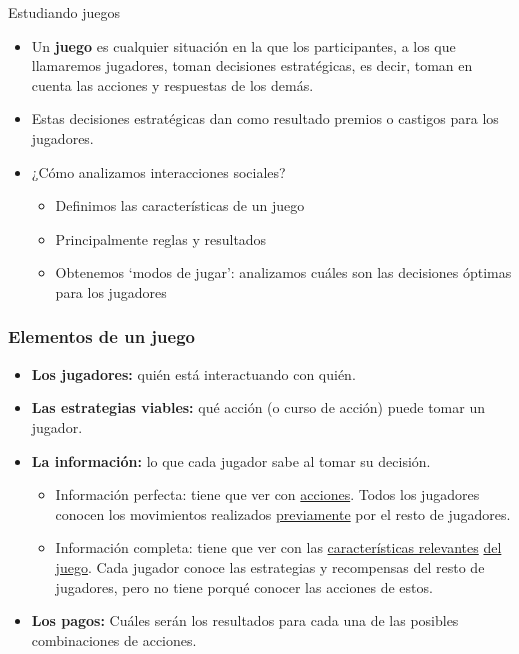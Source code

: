 \documentclass{beamer}
\begin{document}
\begin{frame}{Estudiando juegos}
    \begin{itemize}
        \item Un \textbf{juego} es cualquier situación en la que los participantes, a los que llamaremos jugadores, toman decisiones estratégicas, es decir, toman en cuenta las acciones y respuestas de los demás. \vspace{1mm}
        \item Estas decisiones estratégicas dan como resultado premios o castigos para los jugadores. \vspace{1mm} 
        \item ¿Cómo analizamos interacciones sociales?
        \begin{itemize}
            \item Definimos las características de un juego
            \item Principalmente reglas y resultados
            \item Obtenemos ‘modos de jugar’: analizamos cuáles son las decisiones óptimas para los jugadores
        \end{itemize}
    \end{itemize}
\end{frame}


\begin{frame}
    \frametitle{Elementos de un juego}
    \begin{itemize}
        \item \textbf{Los jugadores:} quién está interactuando con quién. \vspace{1mm} 
        \item \textbf{Las estrategias viables:} qué acción (o curso de acción) puede tomar un jugador. \vspace{1mm} 
        \item \textbf{La información:} lo que cada jugador sabe al tomar su decisión. \vspace{1mm} 
        \begin{itemize}
            \item Información perfecta: tiene que ver con \underline{acciones}. Todos los jugadores conocen los movimientos realizados \underline{previamente} por el resto de jugadores. \vspace{1mm} 
            \item Información completa: tiene que ver con las \underline{características relevantes} \underline{del juego}. Cada jugador conoce las estrategias y recompensas del resto de jugadores, pero no tiene porqué conocer las acciones de estos. \vspace{1mm} 
        \end{itemize}
        \item \textbf{Los pagos:} Cuáles serán los resultados para cada una de las posibles combinaciones de acciones.\vspace{4mm}
    \end{itemize}
\end{frame}
\end{document}
